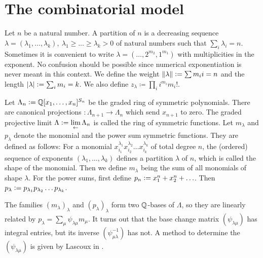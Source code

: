 \section{The combinatorial model}
\begin{definition}
Let $n$ be a natural number. A partition of $n$ is a decreasing sequence $\lambda = (\lambda_1,\ldots,\lambda_k),\ \lambda_1\geq\ldots\geq\lambda_k>0$ of natural numbers such that $\sum_i \lambda_i =n$. Sometimes it is convenient to write $\lambda = (\ldots,2^{m_2},1^{m_1})$ with multiplicities in the exponent. No confusion should be possible since numerical exponentiation is never meant in this context. We define the weight $\|\lambda\| \vcentcolon= \sum m_i i =n$ and the length $|\lambda| \vcentcolon=  \sum_i m_i =k$. We also define $z_\lambda \coloneqq\prod_i i^{m_i} m_i!$. 
\end{definition}
\begin{definition} \label{SymFun}
Let $\Lambda_n \vcentcolon=  \mathbb{Q}[x_1,\ldots,x_n]^{S_n}$ be the graded ring of symmetric polynomials. There are canonical projections $: \Lambda_{n+1}\rightarrow\Lambda_n$ which send $x_{n+1}$ to zero. The graded projective limit
$\Lambda\vcentcolon= \lim\limits_{\leftarrow}\Lambda_n$ is called the ring of symmetric functions.
Let $m_\lambda$ and $p_\lambda$ denote the monomial and the power sum symmetric functions. They are defined as follows: For a monomial $x_{i_1}^{\lambda_1}x_{i_2}^{\lambda_2}\ldots x_{i_k}^{\lambda_k}$ of total degree $n$, the (ordered) sequence of exponents $(\lambda_1,\ldots,\lambda_k)$ defines a partition $\lambda$ of $n$, which is called the shape of the monomial. Then we define $m_\lambda$ being the sum of all monomials of shape $\lambda$. For the power sums, first define $p_n \vcentcolon=  x_1^n + x_2^n + \ldots$. Then $p_\lambda \vcentcolon=  p_{\lambda_1}p_{\lambda_2}\ldots p_{\lambda_k}$.

The families $(m_\lambda)_\lambda$ and $(p_\lambda)_\lambda$ form two $\mathbb{Q}$-bases of $\Lambda$, so they are linearly related by $p_\lambda = \sum_{\mu} \psi_{\lambda\mu}m_\mu$. It turns out that the base change matrix $(\psi_{\lambda\mu})$ has integral entries, but its inverse $(\psi_{\mu\lambda}^{-1})$ has not. A method to determine the $(\psi_{\lambda\mu})$ is given by Lascoux in \cite[Sect. 3.7]{Lascoux}.
\end{definition}

